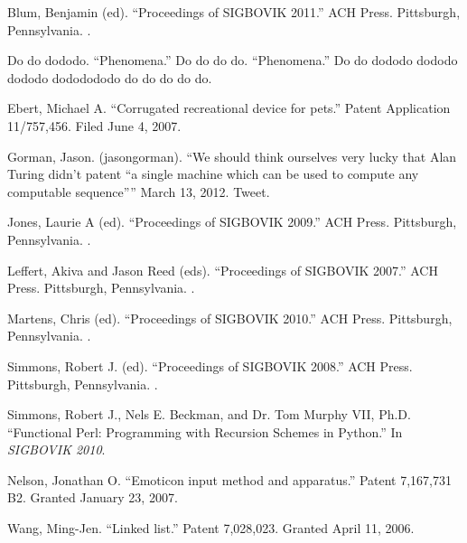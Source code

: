 \documentclass[acmtocl]%
{boviktrans}
\begin{document}
\begin{thebibliography}{1}

Blum, Benjamin (ed).
\newblock ``Proceedings of SIGBOVIK 2011.''
\newblock ACH Press.
\newblock Pittsburgh, Pennsylvania.
.

Do do dododo. 
\newblock ``Phenomena.''
\newblock Do do do do. 
\newblock ``Phenomena.'' 
\newblock Do do dododo dododo dododo dododododo do do do do do.

Ebert, Michael A.
\newblock ``Corrugated recreational device for pets.''
\newblock Patent Application 11/757,456.
\newblock Filed June 4, 2007.

Gorman, Jason. 
\newblock (jasongorman).
\newblock ``We should think ourselves very lucky that Alan Turing didn't patent ``a single machine which can be used to compute any computable sequence''''
\newblock March 13, 2012.
\newblock Tweet.

Jones, Laurie A (ed).
\newblock ``Proceedings of SIGBOVIK 2009.''
\newblock ACH Press.
\newblock Pittsburgh, Pennsylvania.
.

Leffert, Akiva and Jason Reed (eds).
\newblock ``Proceedings of SIGBOVIK 2007.''
\newblock ACH Press.
\newblock Pittsburgh, Pennsylvania.
.

Martens, Chris (ed).
\newblock ``Proceedings of SIGBOVIK 2010.''
\newblock ACH Press.
\newblock Pittsburgh, Pennsylvania.
.

Simmons, Robert J. (ed).
\newblock ``Proceedings of SIGBOVIK 2008.''
\newblock ACH Press.
\newblock Pittsburgh, Pennsylvania.
.

Simmons, Robert J., Nels E. Beckman, and Dr. Tom Murphy VII, Ph.D.
\newblock ``Functional Perl: Programming with Recursion Schemes in Python.''
\newblock In {\it SIGBOVIK 2010}.

Nelson, Jonathan O.
\newblock ``Emoticon input method and apparatus.''
\newblock Patent 7,167,731 B2.
\newblock Granted January 23, 2007.

Wang, Ming-Jen.
\newblock ``Linked list.''
\newblock Patent 7,028,023.
\newblock Granted April 11, 2006.


\end{thebibliography}
\end{document}
